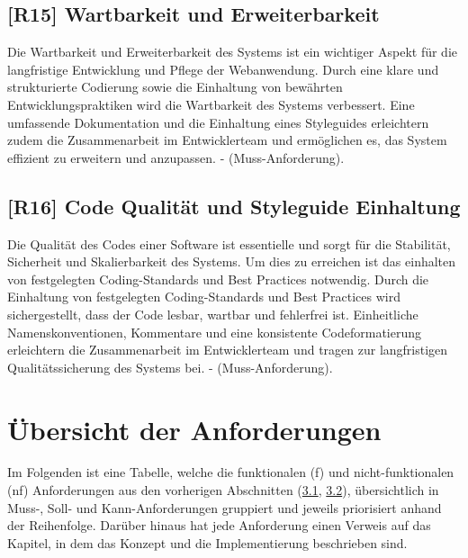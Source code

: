 \subsection{[R15] Wartbarkeit und Erweiterbarkeit}

Die Wartbarkeit und Erweiterbarkeit des Systems ist ein wichtiger Aspekt für die langfristige Entwicklung und Pflege der Webanwendung. Durch eine klare und strukturierte Codierung sowie die Einhaltung von bewährten Entwicklungspraktiken wird die Wartbarkeit des Systems verbessert. Eine umfassende Dokumentation und die Einhaltung eines Styleguides erleichtern zudem die Zusammenarbeit im Entwicklerteam und ermöglichen es, das System effizient zu erweitern und anzupassen. - (Muss-Anforderung).

\subsection{[R16] Code Qualität und Styleguide Einhaltung}

Die Qualität des Codes einer Software ist essentielle und sorgt für die Stabilität, Sicherheit und Skalierbarkeit des Systems. Um dies zu erreichen ist das einhalten von festgelegten Coding-Standards und Best Practices notwendig. Durch die Einhaltung von festgelegten Coding-Standards und Best Practices wird sichergestellt, dass der Code lesbar, wartbar und fehlerfrei ist. Einheitliche Namenskonventionen, Kommentare und eine konsistente Codeformatierung erleichtern die Zusammenarbeit im Entwicklerteam und tragen zur langfristigen Qualitätssicherung des Systems bei. - (Muss-Anforderung).

\section{Übersicht der Anforderungen}
\label{chapter:3-section:uebersicht-anforderungen}

Im Folgenden ist eine Tabelle, welche die funktionalen (f) und nicht-funktionalen (nf) Anforderungen aus den vorherigen Abschnitten (\hyperref[chapter:3-section:funktionale-anforderungen]{3.1}, \hyperref[chapter:3-section:nichtfunktionale-anforderungen]{3.2}), übersichtlich in Muss-, Soll- und Kann-Anforderungen gruppiert und jeweils priorisiert anhand der Reihenfolge. Darüber hinaus hat jede Anforderung einen Verweis auf das Kapitel, in dem das Konzept und die Implementierung beschrieben sind.

